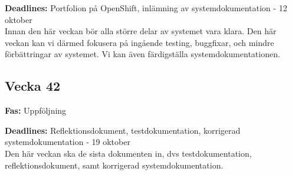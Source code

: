 \documentclass{TDP003mall}
\begin{document}
\textbf{Deadlines:} Portfolion på OpenShift, inlämning av systemdokumentation - 12 oktober\\

Innan den här veckan bör alla större delar av systemet vara klara. Den här veckan kan vi därmed fokusera på ingående testing, buggfixar, och mindre förbättringar av systemet. Vi kan även färdigställa systemdokumentationen.\\


\subsection*{Vecka 42}

\textbf{Fas:} Uppföljning

\textbf{Deadlines:} Reflektionsdokument, testdokumentation, korrigerad systemdokumentation - 19 oktober\\

Den här veckan ska de sista dokumenten in, dvs testdokumentation, reflektionsdokument, samt korrigerad systemdokumentation.\\
\end{document}
